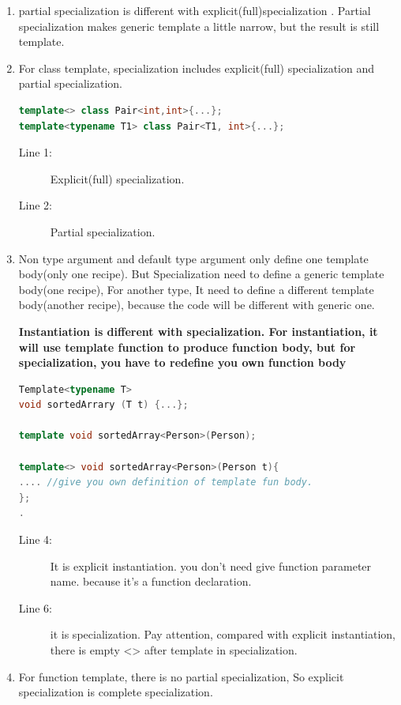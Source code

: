 \documentclass[a4paper,11pt,twoside]{book}
\begin{document}
\begin{itemize}
\begin{enumerate}
	\item partial specialization is different with explicit(full)specialization . Partial specialization makes generic template a little narrow, but the result is still template. 
	 
	\item For class template, specialization includes explicit(full) specialization and partial specialization.
\begin{lstlisting}[frame=single, language=c++]
template<> class Pair<int,int>{...}; 
template<typename T1> class Pair<T1, int>{...}; 
\end{lstlisting}
\begin{description}
	\item[Line 1:] Explicit(full) specialization.
	\item[Line 2:] Partial specialization.
\end{description}
	
	\item Non type argument and default type argument only define one template body(only one recipe). But Specialization need to define a generic template body(one recipe), For another type, It need to define a different template body(another recipe), because the code will be different with generic one.
	 
	 \textbf{Instantiation is different with specialization.  For instantiation, it will use template function to produce function body, but for specialization, you have to redefine you own function body }
	 
\begin{lstlisting}[frame=single, language=c++]
Template<typename T>
void sortedArrary (T t) {...};

template void sortedArray<Person>(Person);

template<> void sortedArray<Person>(Person t){
.... //give you own definition of template fun body.
};
.
\end{lstlisting}
\begin{description}
	\item[Line 4:] It is explicit instantiation. you don't need give function parameter name. because it's a function declaration.
	\item[Line 6:] it is specialization. Pay attention, compared with explicit instantiation, there is empty <> after template in specialization.
\end{description}

	\item For function template, there is no partial specialization, So explicit specialization is complete specialization.
\end{enumerate}



\end{itemize}
\end{document}
